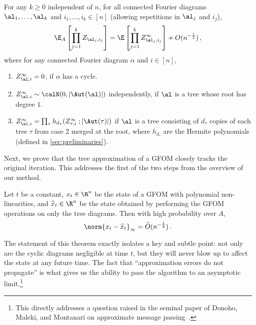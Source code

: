 \documentclass[12pt]{article}
\begin{document}
\begin{theorem}
\label{thm:intro-classification}
    For any $k\ge 0$ independent of $n$, for all connected Fourier diagrams $\al_1, \dots, \al_k$ and $i_1, \ldots, i_k\in [n]$ (allowing repetitions in $\al_j$ and $i_j$),
    \[
        \E_{A} \left[\prod_{j = 1}^k Z_{\al_j,i_j}\right] = \E\left[\prod_{j = 1}^k Z^{\infty}_{\al_j,i_j}\right] + O(n^{-\frac 1 2})\,,
    \]
    where for any connected Fourier diagram $\alpha$ and $i\in [n]$,
    \begin{enumerate}
        \item $Z^\infty_{\al,i} = 0$, if $\alpha$ has a cycle.
        \item $Z^\infty_{\al,i} \sim \calN(0, \left|\Aut(\al)\right|)$ independently, if $\al$ is a tree whose root has degree $1$.
        \item $Z^\infty_{\al,i} = \prod_{\tau} h_{d_\tau}(Z_{\tau,i}^\infty\;; \left|\Aut(\tau)\right|)$ if $\al$ is a tree consisting of $d_\tau$ copies of each tree $\tau$ from case 2 merged at the root, where $h_{d_\tau}$ are the Hermite polynomials (defined in \cref{sec:preliminaries}).
    \end{enumerate}
    \label{thm:main1}
\end{theorem}



Next, we prove that the tree approximation of
a GFOM closely tracks the original iteration. 
This addresses the first of the two steps
from the overview of our method.

\begin{theorem}
\label{thm:intro-tree-approx}
    Let $t$ be a constant, $x_t\in \R^n$ be the state of a GFOM with polynomial non-linearities, and $\widehat{x}_t \in \R^n$ be the state obtained by performing the GFOM operations on only the tree diagrams. Then with high probability over $A$,
    \[
        \norm{x_t - \widehat{x}_t}_\infty = \widetilde{O}(n^{-\frac 1 2})\,.
    \]
    \label{thm:main2}
\end{theorem}

The statement of this theorem exactly isolates a key and subtle point: not only are the cyclic
diagrams negligible at time $t$, but they will never blow up to affect
the state at any future time.
The fact that ``approximation
errors do not propagate'' is what gives us the ability to pass the algorithm to an asymptotic limit.\footnote{This directly addresses a question raised in the seminal paper of Donoho, Maleki, and Montanari on approximate message passing~\cite[Section III.E]{donoho2010message}.} 
\end{document}

